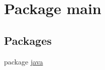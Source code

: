\hypertarget{namespacemain}{}\section{Package main}
\label{namespacemain}
\subsection*{Packages}
\begin{DoxyCompactItemize}
\item 
package \hyperlink{namespacemain_1_1java}{java}
\end{DoxyCompactItemize}
